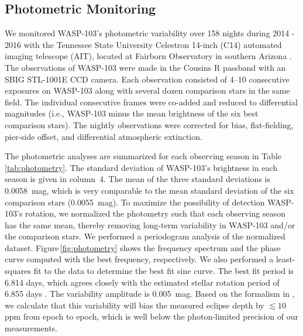 \documentclass[twocolumn]{aastex61}
\begin{document}
\subsection{Photometric Monitoring}
We monitored WASP-103's photometric variability over 158 nights during 2014 - 2016 with the Tennessee State University Celestron 14-inch (C14) automated imaging telescope (AIT), located at Fairborn Observatory in southern Arizona \citep[][]{henry99}.  The observations of WASP-103 were made in the Cousins R passband with an SBIG STL-1001E CCD camera.  Each observation consisted of 4--10 consecutive exposures on WASP-103 along with several dozen comparison stars in the same field. The individual consecutive frames were co-added and reduced to differential magnitudes (i.e., WASP-103 minus the mean brightness of the six best comparison stars). The nightly observations were corrected for bias, flat-fielding, pier-side offset, and differential atmospheric extinction.  

The photometric analyses are summarized for each observing season in Table\,\ref{tab:photometry}.  The standard deviation of WASP-103's brightness in each season is given in column~4.  The mean of the three standard deviations is 0.0058~mag, which is very comparable to the mean standard deviation of the six comparison stars (0.0055~mag).  To maximize the possibility of detection WASP-103's rotation, we normalized the photometry such that each observing season has the same mean, thereby removing long-term variability in WASP-103 and/or the comparison stars. We performed a periodogram analysis of the normalized dataset. Figure\,\ref{fig:photometry} shows the frequency spectrum and the phase curve computed with the best frequency, respectively.  We also performed a least-squares fit to the data to determine the best fit sine curve. The best fit period is 6.814 days, which agrees closely with the estimated stellar rotation period of 6.855 days \citep{gillon14}.  The variability amplitude is 0.005~mag. Based on the formalism in \cite{zellem17}, we calculate that this variability will bias the measured eclipse depth by $\lesssim10$\,ppm from epoch to epoch, which is well below the photon-limited precision of our measurements.
\end{document}
